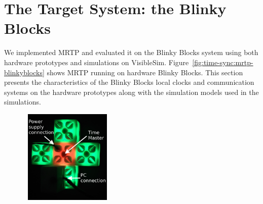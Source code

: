 \section{The Target System: the Blinky Blocks}
\label{section:time-sync:target}

We implemented MRTP and evaluated it on the Blinky Blocks system using both hardware prototypes and simulations on VisibleSim. Figure~\ref{fig:time-sync:mrtp-blinkyblocks} shows MRTP running on hardware Blinky Blocks. This section presents the characteristics of the Blinky Blocks local clocks and communication systems on the hardware prototypes along with the simulation models used in the simulations.

{
\newcommand{\ImgWidth}{4.5cm}
\newcommand{\ImgHeight}{4.5cm}
\begin{figure}[!h]
	\begin{center}
		\includegraphics[width=\ImgWidth,height=\ImgHeight]{images/time-synchronization/cross.png}

\end{center}
\end{figure}}
